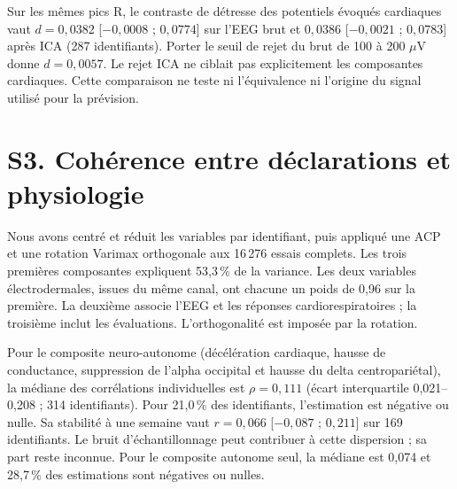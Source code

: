 \documentclass[10pt]{article}
\begin{document}
Sur les mêmes pics R, le contraste de détresse des potentiels évoqués cardiaques vaut $d=0{,}0382$ [$-0{,}0008$ ; $0{,}0774$] sur l’EEG brut et $0{,}0386$ [$-0{,}0021$ ; $0{,}0783$] après ICA (287 identifiants). Porter le seuil de rejet du brut de 100 à 200 $\mu$V donne $d=0{,}0057$. Le rejet ICA ne ciblait pas explicitement les composantes cardiaques. Cette comparaison ne teste ni l’équivalence ni l’origine du signal utilisé pour la prévision.
\section*{S3. Cohérence entre déclarations et physiologie}
Nous avons centré et réduit les variables par identifiant, puis appliqué une ACP et une rotation Varimax orthogonale aux 16\,276 essais complets. Les trois premières composantes expliquent 53,3\,\% de la variance. Les deux variables électrodermales, issues du même canal, ont chacune un poids de 0,96 sur la première. La deuxième associe l’EEG et les réponses cardiorespiratoires ; la troisième inclut les évaluations. L’orthogonalité est imposée par la rotation.

Pour le composite neuro-autonome (décélération cardiaque, hausse de conductance, suppression de l’alpha occipital et hausse du delta centropariétal), la médiane des corrélations individuelles est $\rho=0{,}111$ (écart interquartile 0,021--0,208 ; 314 identifiants). Pour 21,0\,\% des identifiants, l’estimation est négative ou nulle. Sa stabilité à une semaine vaut $r=0{,}066$ [$-0{,}087$ ; $0{,}211$] sur 169 identifiants. Le bruit d’échantillonnage peut contribuer à cette dispersion ; sa part reste inconnue. Pour le composite autonome seul, la médiane est 0,074 et 28,7\,\% des estimations sont négatives ou nulles.
\clearpage
\end{document}
